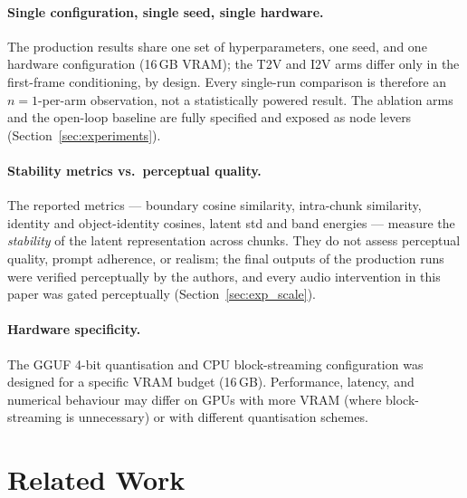 \documentclass[12pt]{article}
\begin{document}
\paragraph{Single configuration, single seed, single hardware.}
The production results share one set of hyperparameters, one seed, and one
hardware configuration (16\,GB VRAM); the T2V and I2V arms differ only in
the first-frame conditioning, by design.  Every single-run comparison is
therefore an $n=1$-per-arm observation, not a statistically powered result.
The ablation arms and the open-loop baseline are fully specified and exposed
as node levers (Section~\ref{sec:experiments}).

\paragraph{Stability metrics vs.\ perceptual quality.}
The reported metrics --- boundary cosine similarity, intra-chunk similarity,
identity and object-identity cosines, latent std and band energies ---
measure the \emph{stability} of the latent representation across chunks.
They do not assess perceptual quality, prompt adherence, or realism; the
final outputs of the production runs were verified perceptually by the
authors, and every audio intervention in this paper was gated perceptually
(Section~\ref{sec:exp_scale}).

\paragraph{Hardware specificity.}
The GGUF 4-bit quantisation and CPU block-streaming configuration was
designed for a specific VRAM budget (16\,GB).  Performance, latency, and
numerical behaviour may differ on GPUs with more VRAM (where block-streaming
is unnecessary) or with different quantisation schemes.

\section{Related Work}
\label{sec:related}
\end{document}

